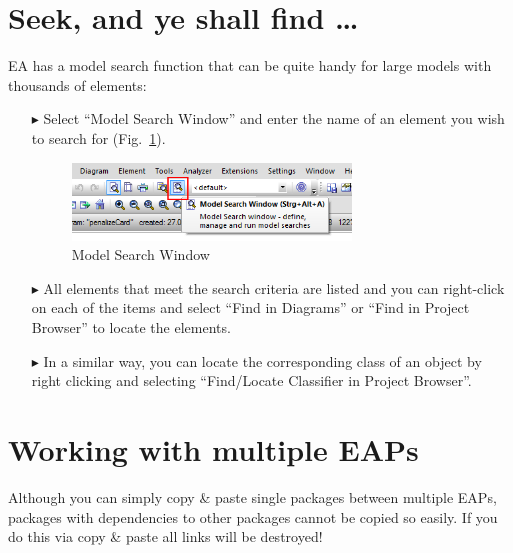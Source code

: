 \section{Seek, and ye shall find \ldots}
EA has a model search function that can be quite handy for large models with thousands of elements:

\begin{enumerate}
\item[$\blacktriangleright$]Select ``Model Search Window'' and enter the name of an element you wish to search for (Fig.~\ref{fig_search01}). 
\begin{figure}[htbp]
\begin{center}
  \includegraphics[width=0.7\textwidth]{pics/tricks/search/search1}
  \caption{Model Search Window}  
  \label{fig_search01}
\end{center}
\end{figure}

\item[$\blacktriangleright$]
All elements that meet the search criteria are listed and you can right-click on each of the items and select ``Find in Diagrams'' or  ``Find in Project Browser'' to locate the elements. 

\item[$\blacktriangleright$]
In a similar way, you can locate the corresponding class of an object by right clicking and selecting ``Find/Locate Classifier in Project Browser''.
\end{enumerate}


\section{Working with multiple EAPs} 

Although you can simply copy \& paste single packages between multiple EAPs, packages with dependencies to other packages cannot be copied so easily.
If you do this via copy \& paste all links will be destroyed!

